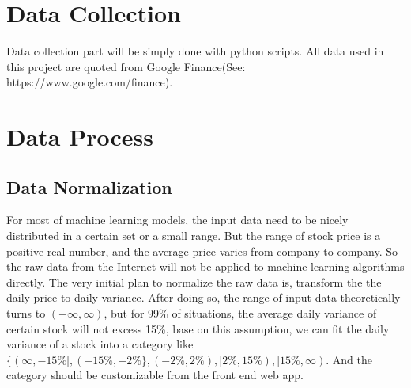 \documentclass[11pt]{report}
\begin{document}
\section{Data Collection}
Data collection part will be simply done with python scripts. All data used in this project are quoted from Google Finance(See: https://www.google.com/finance).
\section{Data Process}

\subsection{Data Normalization}
For most of machine learning models, the input data need to be nicely distributed in a certain set or a small range. But the range of stock price is a positive real number, and the average price varies from company to company. So the raw data from the Internet will not be applied to machine learning algorithms directly. The very initial plan to normalize the raw data is, transform the the daily price to daily variance. After doing so, the range of input data theoretically turns to $(-\infty,\infty)$, but for 99\% of situations, the average daily variance of certain stock will not excess 15\%, base on this assumption, we can fit the daily variance of a stock into a category like $\{(\infty,-15\%],(-15\%,-2\%\},(-2\%,2\%),[2\%,15\%),[15\%,\infty)$. And the category should be customizable from the front end web app.
\end{document}
